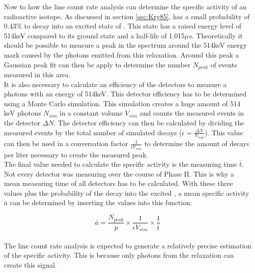 \documentclass[encoding=utf8,british]{tumphthesis}
\begin{document}
Now to how the line count rate analysis can determine the specific activity of an radioactive isotope.
As discussed in section \ref{sec:Kry85}, \Kr has a small probability of 0.43\% to decay into an excited state of . 
This state has a raised energy level of 514keV compared to its ground state and a half-life of 1.015\(\unit{\mu s}\). 
Theoretically it should be possible to measure a peak in the spectrum around the 514keV energy mark caused by the photons emitted from this relaxation.
Around this peak a Gaussian peak fit can then be apply to determine the number $N_{peak}$ of events measured in this area. 
\\

It is also necessary to calculate an efficiency of the detectors to measure a photons with an energy of 514keV.
This detector efficiency has to be determined using a Monte Carlo simulation.
This simulation creates a huge amount of 514 keV photons $N_{sim}$  in a constant volume $V_{sim}$ and counts the measured events in the detector $\Delta N$. 
The detector efficiency can then be calculated by dividing the measured events by the total number of simulated decays ($\epsilon = \frac{\Delta N}{N_{sim}}$).
This value can then be used in a conversation factor $\frac{1}{\epsilon V_{sim}}$ to determine the amount of decays per liter necessary to create the measured peak.
\\

The final value needed to calculate the specific activity is the measuring time $\bar{t}$.
Not every detector was measuring over the course of Phase II.
This is why a mean measuring time of all detectors has to be calculated.
With these three values plus the probability of the decay into the excited , a mean specific activity $\bar{a}$ can be determined by inserting the values into this function:

\begin{equation*}
    \bar{a} = \frac{N_{peak}}{p}\times\frac{1}{\epsilon V_{sim}}\times\frac{1}{\bar{t}}
\end{equation*}\\

The line count rate analysis is expected to generate a relatively precise estimation of the specific activity.
This is because only photons from the  relaxation can create this signal.
\\
\end{document}
